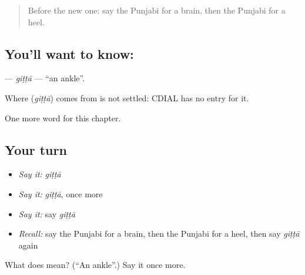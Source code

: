 \label{lesson:PA-C136-gitta}



\begin{quote}
Before the new one: say the Punjabi for a brain, then the Punjabi for a heel.
\end{quote}

\subsection*{You'll want to know: }
\textbf{} — \emph{giṭṭā} — \textquotedblleft{}an ankle\textquotedblright{}.

\begin{cousinweb}
Where \textbf{} (\emph{giṭṭā}) comes from is not settled: CDIAL has no entry for it.
\end{cousinweb}

\begin{grammarlens}[title={What you've built}]
One more word for this chapter.
\end{grammarlens}

\subsection*{Your turn}
\begin{itemize}
\raggedright
  \item \emph{Say it:} \emph{giṭṭā}
  \item \emph{Say it:} \emph{giṭṭā}, once more
  \item \emph{Say it:} say \emph{giṭṭā}
  \item \emph{Recall:} say the Punjabi for a brain, then the Punjabi for a heel, then say \emph{giṭṭā} again
\end{itemize}

\begin{tcolorbox}[breakable,colback=teal!4,colframe=teal!35!black,title={Before you move on}]
What does  mean? (\textquotedblleft{}An ankle\textquotedblright{}.) Say it once more.
\end{tcolorbox}
